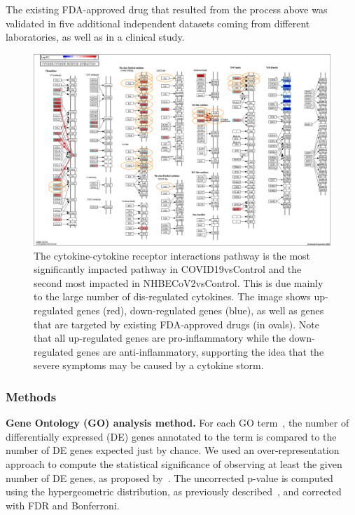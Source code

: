 The existing FDA-approved drug that resulted from the process above was validated in five additional independent datasets coming from different laboratories, as well as in a clinical study.  

\begin{figure}
\centering
	\includegraphics[width=0.9\linewidth]{../Figures/Cytokine_cytokine_receptor_interaction_drugs.png}
    \caption{ The cytokine-cytokine receptor interactions pathway is the most significantly impacted pathway in COVID19vsControl and the second most impacted in NHBECoV2vsControl. This is due mainly to the large number of dis-regulated cytokines. The image shows up-regulated genes (red), down-regulated genes (blue), as well as  genes 
    that are targeted by existing FDA-approved drugs (in ovals). Note that all up-regulated genes are pro-inflammatory while the down-regulated genes are anti-inflammatory, supporting the idea that the severe symptoms may be caused by a cytokine storm.}
        \label{Supp:cytokine-cytokine_pathway}
\end{figure}


\subsubsection{Methods}
\textbf{Gene Ontology (GO) analysis method.}  For each GO term~\cite{ashburner2002ontologies, gene2004gene}, the number of differentially expressed (DE) genes annotated to the term is compared to the number of DE genes expected just by chance. We used  an over-representation approach to compute the statistical significance of observing at least the given number of DE genes, as proposed by~\cite{Tavazoie:1999}. The uncorrected p-value is computed using the hypergeometric distribution, as previously described~\cite{DraghiciOE2:2003, DraghiciBook:2011}, and corrected with FDR and Bonferroni.

